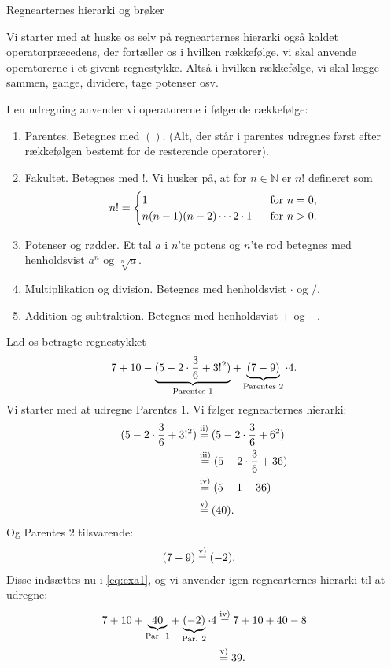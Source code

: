 \begin{center}
\Huge
Regnearternes hierarki og brøker
\end{center}

Vi starter med at huske os selv på regnearternes hierarki også kaldet operatorpræcedens, der fortæller os i hvilken rækkefølge, vi skal anvende operatorerne i et givent regnestykke. Altså i hvilken rækkefølge, vi skal lægge sammen, gange, dividere, tage potenser osv. 
\begin{defn}
I en udregning anvender vi operatorerne i følgende rækkefølge:
\begin{enumerate}[label=\roman*)]
\item Parentes. Betegnes med $()$. (Alt, der står i parentes udregnes først efter rækkefølgen bestemt for de resterende operatorer).
\item Fakultet. Betegnes med $!$. Vi husker på, at for $n\in \mathbb{N}$ er $n!$ defineret som 
\begin{align*}
n! = \begin{cases}
1 \ &\textnormal{ for }n=0,\\
n(n-1)(n-2)\cdots 2\cdot 1 \ &\textnormal{ for }n>0.
\end{cases}
\end{align*}
\item Potenser og rødder. Et tal $a$ i $n$'te potens og $n$'te rod betegnes med henholdsvist $a^n$ og $\sqrt[n]{a}$.
\item Multiplikation og division. Betegnes med henholdsvist $\cdot$ og $/$.
\item Addition og subtraktion. Betegnes med henholdsvist $+$ og $-$.
\end{enumerate}
\end{defn} 
\begin{exa}
Lad os betragte regnestykket
\begin{align}\label{eq:exa1}
7+10-\underbrace{(5-2\cdot \frac{3}{6}+3!^2)}_{\textnormal{Parentes 1}}+\underbrace{(7-9)}_{\textnormal{Parentes 2}}\cdot 4.
\end{align}
Vi starter med at udregne Parentes 1. Vi følger regnearternes hierarki:
\begin{align*}
(5-2\cdot \frac{3}{6}+3!^2) &\overset{\textnormal{ii)}}{=} (5-2\cdot \frac{3}{6}+6^2)\\
							&\overset{\textnormal{iii)}}{=} (5-2\cdot \frac{3}{6}+36)\\
							&\overset{\textnormal{iv)}}{=} (5-1+36)\\
							&\overset{\textnormal{v)}}{=} (40).
\end{align*}
Og Parentes 2 tilsvarende:
\begin{align*}
(7-9) &\overset{\textnormal{v)}}{=} (-2).
\end{align*}
Disse indsættes nu i \eqref{eq:exa1}, og vi anvender igen regnearternes hierarki til at udregne:
\begin{align*}
7+10+\underbrace{40}_{\textnormal{Par. 1}} + \underbrace{(-2)}_{\textnormal{Par. 2}}\cdot 4 &\overset{\textnormal{iv)}}{=} 7+10+40 -8 \\
&\overset{\textnormal{v)}}{=} 39.
\end{align*}
\end{exa}


